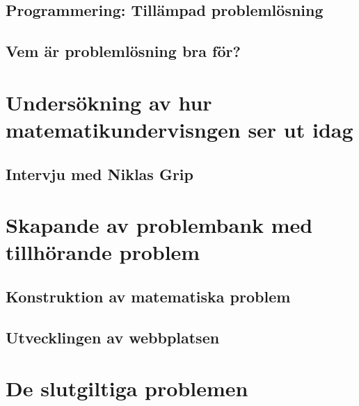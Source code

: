 \documentclass[11pt,a4paper]{article}
\begin{document}
    \subsection{Programmering: Tillämpad problemlösning}
        \label{sec:ProgrammeringOchMatematik}
        
        
    \subsection{Vem är problemlösning bra för?}
        
    
\section{Undersökning av hur matematikundervisngen ser ut idag}
    
    
    
    \subsection{Intervju med Niklas Grip}
    
    \label{sec:intervju}
    
\section{Skapande av problembank med tillhörande problem}
    \label{sec:skapandetavproblembank}
    
    
    \subsection{Konstruktion av matematiska problem}
    \label{sec:Skapandetavproblem}
        

    \subsection{Utvecklingen av webbplatsen}
        
        
\section{De slutgiltiga problemen}
    
\end{document}
